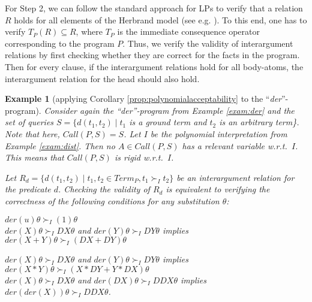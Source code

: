 \documentclass[envcountsame]{tlp}
\newcounter{ex:der-lastsymconsctr}
\newtheorem{example}{Example}
\begin{document}
For Step 2, we can follow the standard approach for LPs to verify that a
relation $R$
holds for all elements
of the Herbrand model (see e.g. \cite{Lloyd87}). To this end, 
one has to verify $T_P(R) \subseteq R$, where
$T_P$ is the immediate consequence operator corresponding to the program $P$.
Thus, we verify the validity of interargument
relations by first checking whether they are correct for the facts in the program. Then for every
clause, if the interargument relations hold for all body-atoms, the
interargument
relation for the head
should also hold.




\begin{example}[applying Corollary \ref{prop:polynomialacceptability} to the
``\textit{der}''-program]\label{rigid-order:der}
Consider again the ``\textit{der}''-program from Example \ref{exam:der}
and the  set of queries $S=\{d(t_1,t_2) \mid t_1$ is a ground
term and
$t_2$ is an arbitrary term\}. Note that here, $\mathit{Call}(P,S) = S$.
Let $I$ be the polynomial interpretation from Example \ref{exam:dist}. 
Then no $A \in \mathit{Call}(P,S)$ has a relevant variable w.r.t.\
$I$.
This
means that $\mathit{Call}(P,S)$ is rigid w.r.t.\ $I$.


Let $R_{d} = \{d(t_1,t_2) \mid t_1, t_2 \in Term_P, 
t_1 \succ_I t_2\}$ be an
interargument relation for the predicate $d$.
Checking the validity of $R_{d}$ is equivalent to
verifying the correctness of the following conditions for any substitution
$\theta$:
\begin{center}
    $\mathit{der}(u)\theta \succ_I (1)\theta$\\\vspace{3mm} 
    $\mathit{der}(X)\theta \succ_I \mathit{DX}\theta$ and 
$\mathit{der}(Y)\theta \succ_I \mathit{DY}\theta$ implies \\  
    $\mathit{der}(X+Y)\theta \succ_I (\mathit{DX}+\mathit{DY})\theta$\\\vspace{3mm} 

    $\mathit{der}(X)\theta \succ_I \mathit{DX}\theta$ and 
$\mathit{der}(Y)\theta \succ_I \mathit{DY}\theta$ implies \\ 
$\mathit{der}(X*Y)\theta \succ_I (X*\mathit{DY}+Y*\mathit{DX})\theta$\\\vspace{3mm}
    $\mathit{der}(X)\theta \succ_I \mathit{DX}\theta$ and 
$\mathit{der}(\mathit{DX})\theta \succ_I \mathit{DDX}\theta$ implies\\
    $\mathit{der}(\mathit{der}(X))\theta \succ_I \mathit{DDX}\theta$.\\\vspace{3mm}
\end{center}


\end{example}
\end{document}
